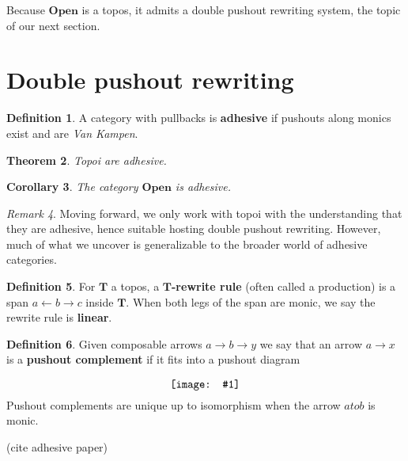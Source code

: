 \documentclass{amsart}
\newcommand{\defn}[1]{\textbf{#1}}
\newcommand{\cat}[1]{\mathbf{#1}}
\newcommand{\diagram}[1]{\raisebox{-0.5\height}{\texttt{[image: \#1]}}}
\newcommand{\OpenOb}{\mathbf{Open} }
\newcommand{\edit}[1]{\textcolor{editcolour}{(#1)}}
\newtheorem{theorem}{Theorem}[section]
\newtheorem{corollary}[theorem]{Corollary}
\theoremstyle{remark}
\newtheorem{remark}[theorem]{Remark}
\theoremstyle{definition}
\newtheorem{definition}[theorem]{Definition}
\begin{document}
Because $ \OpenOb $ is a topos, it admits a double
pushout rewriting system, the topic of our next section.


\section{Double pushout rewriting}
\label{sec:double-push-rewr}
  
\begin{definition} \label{df:dpo_adhesive-category} 
  A category with pullbacks is \defn{adhesive} if pushouts along
  monics exist and are \emph{Van Kampen}.
\end{definition} 

\begin{theorem} \label{thm:dpo_topoi-adhesive} 
  Topoi are adhesive.
\end{theorem}

\begin{corollary} \label{thm:dpo_category-StrCsp-adhsv}
  The category $ \OpenOb $ is adhesive.
\end{corollary}

\begin{remark}
  Moving forward, we only work with topoi with the understanding that
  they are adhesive, hence suitable hosting double pushout rewriting.
  However, much of what we uncover is generalizable to the broader
  world of adhesive categories.
\end{remark}

\begin{definition} \label{df:dpo_rewrite-rule} 
  For $ \cat{T} $ a topos, a \defn{$ \cat{T} $-rewrite rule}
  (often called a production) is a span $ a \gets b \to c $ inside
  $ \cat{T} $.  When both legs of the span are monic, we say the rewrite
  rule is \defn{linear}.
\end{definition}	

\begin{definition} \label{df_dpo_pushout-complement} 
  Given composable arrows $ a \to b \to y $ we say that an arrow
  $ a \to x $ is a \defn{pushout complement} if it fits into a pushout
  diagram
  \[
    \diagram{diag_rw_pushout-comp}
  \]
  Pushout complements are unique up to isomorphism when the arrow \( a
  to b \) is monic.

  \edit{cite adhesive paper}
\end{definition}
\end{document}
